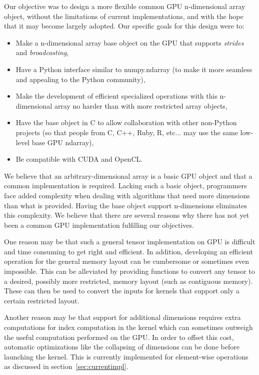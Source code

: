 \documentclass{article} %
\begin{document}
Our objective was to design a more flexible common GPU n-dimensional array object, 
without the limitations of current implementations, and with the hope that it may become largely adopted. 
Our specific goals for this design were to:

\begin{itemize}
\item Make a n-dimensional array base object on the GPU that supports \emph{strides} and \emph{broadcasting},
\item Have a Python interface similar to numpy.ndarray (to make it more seamless and appealing to the Python community),
\item Make the development of efficient specialized operations with this n-dimensional array no harder than with more restricted array objects,
\item Have the base object in C to allow collaboration with other non-Python projects (so that people from C, C++, Ruby, R, etc... may use the same low-level base GPU ndarray),
\item Be compatible with CUDA and OpenCL.
\end{itemize}

We believe that an arbitrary-dimensional array is a basic GPU object and that a common implementation is required.
Lacking such a basic object, programmers face added complexity when dealing with algorithms that need more dimensions than what is provided.
Having the base object support n-dimensions eliminates this complexity.
We believe that there are several reasons why there has not yet been a common GPU implementation fulfilling our objectives.

One reason may be that such a general tensor implementation on GPU is difficult and time consuming to get right and efficient.
In addition, developing an efficient operation for the general memory layout can be cumbersome or sometimes even impossible.
This can be alleviated by providing functions to convert any tensor to a desired, possibly more restricted, memory layout (such as contiguous memory).
These can then be used to convert the inputs for kernels that support only a certain restricted layout.

Another reason may be that support for additional dimensions requires extra computations for index computation in the kernel which can sometimes outweigh the useful computation performed on the GPU.
In order to offset this cost, automatic optimizations like the collapsing of dimensions can be done before launching the kernel.  
This is currently implemented for element-wise operations as discussed in section~\ref{sec:currentimpl}.
\end{document}
